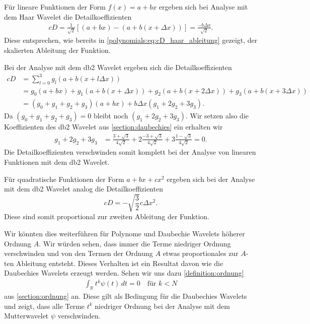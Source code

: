 \begin{refsection}
Für lineare Funktionen der Form $f(x) = a + b x$ ergeben sich bei Analyse mit
dem Haar Wavelet die Detailkoeffizienten
\begin{align*}
    cD = \frac{1}{\sqrt{2}} [ (a + b x) - (a + b (x + \Delta x)) ]
    = \frac{- b \Delta x}{\sqrt{2}}.
\end{align*}
Diese entsprechen, wie bereits in \cref{polynomials:eq:cD_haar_ableitung}
gezeigt, der skalierten Ableitung der Funktion.

Bei der Analyse mit dem db2 Wavelet ergeben sich die Detailkoeffizienten
\begin{align*}
    cD &= \sum_{l=0}^{3} g_l (a + b (x + l\Delta x)) \\
       &= g_0 (a + b x) + g_1 (a + b (x + \Delta x)) + g_2 (a + b (x + 2 \Delta x)) + g_3 (a + b (x + 3 \Delta x)) \\
       &= (g_0 + g_1 + g_2 + g_3) (a + bx) + b \Delta x (g_1 + 2 g_2 + 3 g_3).
\end{align*}
Da $(g_0 + g_1 + g_2 + g_3) = 0$ bleibt noch $(g_1 + 2 g_2 + 3 g_3)$. Wir
setzen also die Koeffizienten des db2 Wavelet aus \cref{section:daubechies}
ein erhalten wir
\begin{align*}
    g_1 + 2 g_2 + 3 g_3 &= \frac{3 + \sqrt{3}}{4\sqrt{2}} + 2 \frac{-3 + \sqrt{3}}{4\sqrt{2}} + 3 \frac{1 - \sqrt{3}}{4\sqrt{2}} = 0.
\end{align*}
Die Detailkoeffizienten verschwinden somit komplett bei der Analyse von
linearen Funktionen mit dem db2 Wavelet.

Für quadratische Funktionen der Form $a + bx + cx^2$ ergeben sich bei der
Analyse mit dem db2 Wavelet analog die Detailkoeffizienten \[cD =
-\sqrt{\frac{3}{2}} c \Delta x^2.\] Diese sind somit proportional zur zweiten
Ableitung der Funktion.

Wir könnten dies weiterführen für Polynome und Daubechie Wavelets höherer
Ordnung $A$. Wir würden sehen, dass immer die Terme niedriger Ordnung
verschwinden und von den Termen der Ordnung $A$ etwas proportionales zur
$A$-ten Ableitung entsteht. Dieses Verhalten ist ein Resultat davon wie die
Daubechies Wavelets erzeugt werden. Sehen wir uns dazu
\cref{definition:ordnung}
\begin{align*}
    \int_{\mathbb R} t^k\psi(t)\,dt=0\quad \text{für $k<N$}
\end{align*}
aus \cref{section:ordnung} an. Diese gilt als Bedingung für die Daubechies
Wavelets und zeigt, dass alle Terme $t^k$ niedriger Ordnung bei der Analyse mit
dem Mutterwavelet $\psi$ verschwinden.


\end{refsection}

